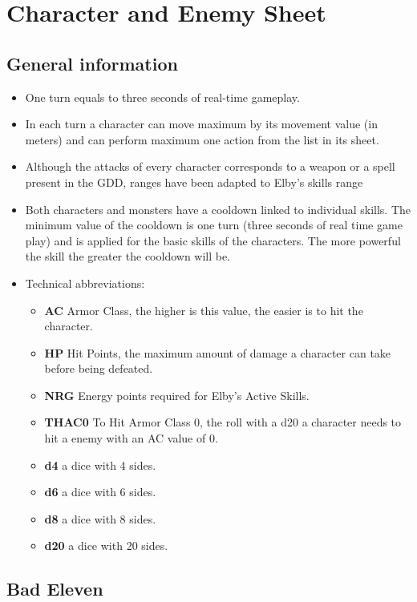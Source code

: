 \section{Character and Enemy Sheet}
\label{sheet}

\subsection{General information}
\begin{itemize}
	\item One turn equals to three seconds of real-time gameplay.
	\item In each turn a character can move maximum by its movement value (in meters) and can perform maximum one action from the list in its sheet.
	\item Although the attacks of every character corresponds to a weapon or a spell present in the GDD, ranges have been adapted to Elby's skills range
	\item Both characters and monsters have a cooldown linked to individual skills. The minimum value of the cooldown is one turn (three seconds of real time game play) and is applied for the basic skills of the characters. The more powerful the skill the greater the cooldown will be.
	\item Technical abbreviations:
	\begin{itemize}
		\item \textbf{AC} Armor Class, the higher is this value, the easier is to hit the character.
		\item \textbf{HP} Hit Points, the maximum amount of damage a character can take before being defeated.
		\item \textbf{NRG} Energy points required for Elby's Active Skills.
		\item \textbf{THAC0} To Hit Armor Class 0, the roll with a d20 a character needs to hit a enemy with an AC value of 0.
		\item \textbf{d4} a dice with 4 sides.
		\item \textbf{d6} a dice with 6 sides.
		\item \textbf{d8} a dice with 8 sides.
		\item \textbf{d20} a dice with 20 sides.
	\end{itemize}
\end{itemize}

\newpage

\subsection{Bad Eleven}

